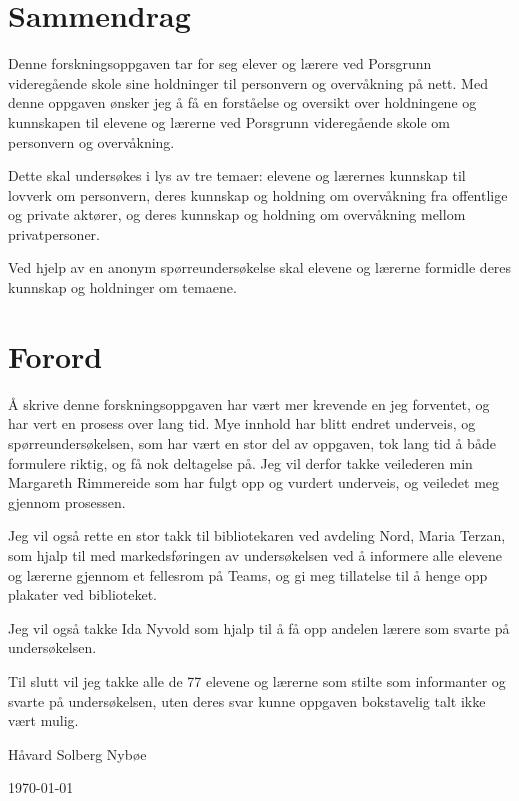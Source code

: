 \section*{Sammendrag}
Denne forskningsoppgaven tar for seg elever og lærere ved Porsgrunn videregående skole sine holdninger til personvern og overvåkning på nett. Med denne oppgaven ønsker jeg å få en forståelse og oversikt over holdningene og kunnskapen til elevene og lærerne ved Porsgrunn videregående skole om personvern og overvåkning. 

Dette skal undersøkes i lys av tre temaer: elevene og lærernes kunnskap til lovverk om personvern, deres kunnskap og holdning om overvåkning fra offentlige og private aktører, og deres kunnskap og holdning om overvåkning mellom privatpersoner.

Ved hjelp av en anonym spørreundersøkelse skal elevene og lærerne formidle deres kunnskap og holdninger om temaene.

\section*{Forord}
Å skrive denne forskningsoppgaven har vært mer krevende en jeg forventet, og har vert en prosess over lang tid. Mye innhold har blitt endret underveis, og spørreundersøkelsen, som har vært en stor del av oppgaven, tok lang tid å både formulere riktig, og få nok deltagelse på. Jeg vil derfor takke veilederen min Margareth Rimmereide som har fulgt opp og vurdert underveis, og veiledet meg gjennom prosessen. 

Jeg vil også rette en stor takk til bibliotekaren ved avdeling Nord, Maria Terzan, som hjalp til med markedsføringen av undersøkelsen ved å informere alle elevene og lærerne gjennom et fellesrom på Teams, og gi meg tillatelse til å henge opp plakater ved biblioteket.

Jeg vil også takke Ida Nyvold som hjalp til å få opp andelen lærere som svarte på undersøkelsen.

Til slutt vil jeg takke alle de 77 elevene og lærerne som stilte som informanter og svarte på undersøkelsen, uten deres svar kunne oppgaven bokstavelig talt ikke vært mulig.

\vfill

Håvard Solberg Nybøe

\today{}


\newpage